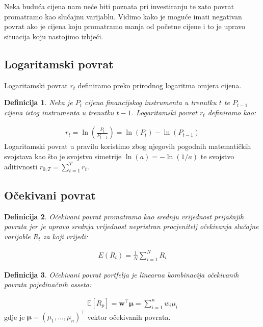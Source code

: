\documentclass[zavrsnirad, upload]{fer}
\newtheorem{definition}{Definicija}
\begin{document}
\noindent Neka buduća cijena nam neće biti poznata pri investiranju te
zato povrat promatramo kao slučajnu varijablu.
Vidimo kako je moguće imati negativan povrat ako je cijena koju
promatramo manja od početne cijene i to je upravo situacija koju
nastojimo izbjeći.

\subsection{Logaritamski povrat}
Logaritamski povrat $r_t$ definiramo preko prirodnog logaritma omjera cijena.

\begin{definition}
    Neka je $P_t$ cijena financijskog instrumenta u trenutku $t$ te
    $P_{t-1}$ cijena istog instrumenta u trenutku $t-1$. Logaritamski povrat
    $r_t$ definiramo kao:
\end{definition}
\begin{align}
    r_t = \ln\left(\frac{P_t}{P_{t-1}}\right) = \ln(P_t) - \ln(P_{t-1})
\end{align}
\noindent Logaritamski povrat u pravilu koristimo zbog njegovih pogodnih
matematičkih svojstava kao što je svojstvo simetrije $\ln(a) = -\ln(1/a)$
te svojstvo aditivnosti $r_{0,T} = \sum_{t=1}^T r_t$.

\subsection{Očekivani povrat }
\label{sek:ocekivani_povrat}
\begin{definition}
	Očekivani povrat promatramo kao srednju vrijednost prijašnjih
	povrata jer je upravo srednja vrijednost nepristran procjenitelj
	očekivanja slučajne varijable $R_t$ za koji vrijedi:
\end{definition}
\begin{align}
	E(R_t) =\frac{1}{N} \sum_{i = 1}^{N} R_i
\end{align}
\begin{definition}
Očekivani povrat portfelja je linearna kombinacija očekivanih povrata pojedinačnih asseta:
\end{definition}
\begin{align}
\mathbb{E}[R_p] =
    \mathbf{w}^\intercal \boldsymbol{\mu} = \sum_{i=1}^n w_i \mu_i
\end{align}
\indent gdje je $\boldsymbol{\mu} = (\mu_1, \dots, \mu_n)^\intercal$ vektor očekivanih povrata.
\end{document}

